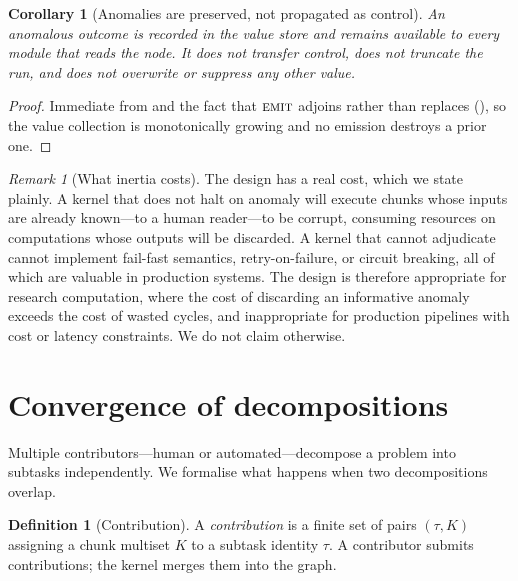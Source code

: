 \documentclass[11pt,a4paper]{article}
\theoremstyle{thmstyle}
\newtheorem{corollary}[theorem]{Corollary}
\theoremstyle{definition}
\newtheorem{definition}[theorem]{Definition}
\theoremstyle{remark}
\newtheorem{remark}[theorem]{Remark}
\newcommand{\emit}{\textsc{emit}}
\begin{document}
\begin{corollary}[Anomalies are preserved, not propagated as control]
\label{cor:anomaly}
An anomalous outcome is recorded in the value store and remains available to
every module that reads the node. It does not transfer control, does not
truncate the run, and does not overwrite or suppress any other value.
\end{corollary}

\begin{proof}
Immediate from  and the fact that $\emit$ adjoins
rather than replaces (), so the value collection is
monotonically growing and no emission destroys a prior one.
\end{proof}

\begin{remark}[What inertia costs]
\label{rem:inertia-cost}
The design has a real cost, which we state plainly. A kernel that does not
halt on anomaly will execute chunks whose inputs are already known---to a
human reader---to be corrupt, consuming resources on computations whose
outputs will be discarded. A kernel that cannot adjudicate cannot implement
fail-fast semantics, retry-on-failure, or circuit breaking, all of which are
valuable in production systems. The design is therefore appropriate for
research computation, where the cost of discarding an informative anomaly
exceeds the cost of wasted cycles, and inappropriate for production
pipelines with cost or latency constraints. We do not claim otherwise.
\end{remark}

\section{Convergence of decompositions}
\label{sec:convergence}

Multiple contributors---human or automated---decompose a problem into
subtasks independently. We formalise what happens when two decompositions
overlap.

\begin{definition}[Contribution]
\label{def:contribution}
A \emph{contribution} is a finite set of pairs $(\tau,K)$ assigning a chunk
multiset $K$ to a subtask identity $\tau$. A contributor submits
contributions; the kernel merges them into the graph.
\end{definition}
\end{document}
